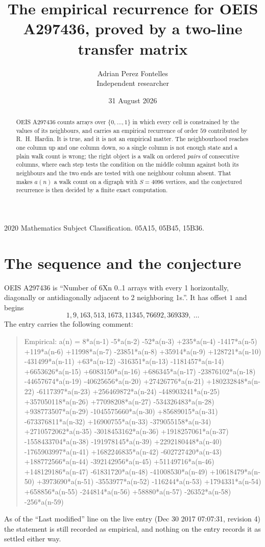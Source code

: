 \documentclass[11pt,a4paper]{article}
\title{The empirical recurrence for OEIS A297436, proved by a two-line transfer matrix}
\author{Adrian Perez Fontelles\\ \small Independent researcher}
\date{31 August 2026}
\theoremstyle{plain}
\theoremstyle{definition}
\begin{document}
\maketitle

\begin{abstract}
OEIS A297436 counts arrays over $\{0,\dots,1\}$ in which every cell is constrained by the
values of its neighbours, and carries an empirical recurrence of order $59$ contributed
by R.~H.~Hardin. It is true, and it is not an empirical matter. The neighbourhood reaches one
column up and one column down, so a single column is not enough state and a plain walk count
is wrong; the right object is a walk on ordered \emph{pairs} of consecutive columns, where
each step tests the condition on the middle column against both its neighbours and the two
ends are tested with one neighbour column absent. That makes $a(n)$ a walk count on a digraph
with $S=4096$ vertices, and the conjectured recurrence is then decided by a finite exact
computation.
\end{abstract}

\noindent\small 2020 Mathematics Subject Classification. 05A15, 05B45, 15B36.\normalsize

\section{The sequence and the conjecture}

OEIS A297436 is ``Number of 6Xn 0..1 arrays with every 1 horizontally, diagonally or antidiagonally adjacent to 2 neighboring 1s.''. It has offset $1$ and begins
\[
1, 9, 163, 513, 1673, 11345, 76692, 369339,\ \dots
\]
The entry carries the following comment:
\begin{quote}\small
Empirical: a(n) = 8*a(n-1) -5*a(n-2) -52*a(n-3) +235*a(n-4) -1417*a(n-5) +119*a(n-6) +11998*a(n-7) -23851*a(n-8) +35914*a(n-9) +128721*a(n-10) -431499*a(n-11) +63*a(n-12) -316351*a(n-13) -1181457*a(n-14) +6653626*a(n-15) +6083150*a(n-16) +686345*a(n-17) -23876102*a(n-18) -44657674*a(n-19) -40625656*a(n-20) +27426776*a(n-21) +180232848*a(n-22) -6117397*a(n-23) +256469872*a(n-24) -448903241*a(n-25) +357050118*a(n-26) +77098208*a(n-27) -534326483*a(n-28) +938773507*a(n-29) -1045575660*a(n-30) +85689015*a(n-31) -673376811*a(n-32) +16900755*a(n-33) -379055158*a(n-34) +2710572062*a(n-35) -3018453162*a(n-36) +1918257061*a(n-37) -1558433704*a(n-38) -191978145*a(n-39) +2292180448*a(n-40) -1765903997*a(n-41) +1682246835*a(n-42) -602727420*a(n-43) +188772566*a(n-44) -392142956*a(n-45) +51149716*a(n-46) +148129186*a(n-47) -61831720*a(n-48) -41008530*a(n-49) +10618479*a(n-50) +3973690*a(n-51) -3553977*a(n-52) -116244*a(n-53) +1794331*a(n-54) +658856*a(n-55) -244814*a(n-56) +58880*a(n-57) -26352*a(n-58) -256*a(n-59)
\end{quote}
As of the ``Last modified'' line on the live entry (Dec 30 2017 07:07:31, revision 4) the statement is
still recorded as empirical, and nothing on the entry records it as settled either way.
\end{document}
